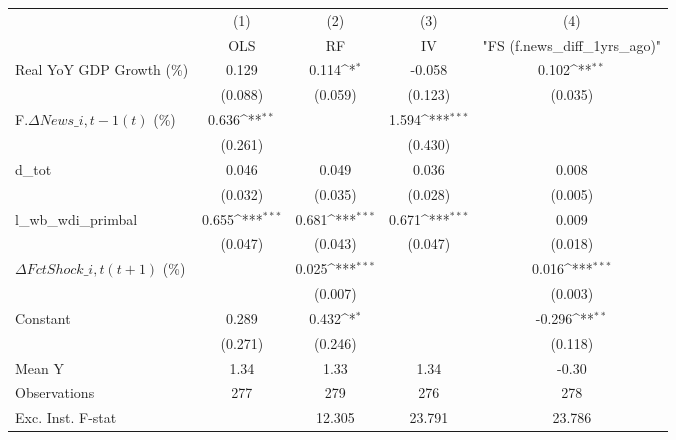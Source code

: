 {
\def\sym#1{\ifmmode^{#1}\else\(^{#1}\)\fi}
\begin{tabular}{l*{4}{c}}
\toprule
                    &\multicolumn{1}{c}{(1)}&\multicolumn{1}{c}{(2)}&\multicolumn{1}{c}{(3)}&\multicolumn{1}{c}{(4)}\\
                    &\multicolumn{1}{c}{OLS}&\multicolumn{1}{c}{RF}&\multicolumn{1}{c}{IV}&\multicolumn{1}{c}{ "FS (f.news\_diff\_1yrs\_ago)" }\\
\midrule
Real YoY GDP Growth (\%)&       0.129         &       0.114\sym{*}  &      -0.058         &       0.102\sym{**} \\
                    &     (0.088)         &     (0.059)         &     (0.123)         &     (0.035)         \\
\addlinespace
F.$ \Delta News\_{i,t-1}(t)$ (\%)&       0.636\sym{**} &                     &       1.594\sym{***}&                     \\
                    &     (0.261)         &                     &     (0.430)         &                     \\
\addlinespace
d\_tot               &       0.046         &       0.049         &       0.036         &       0.008         \\
                    &     (0.032)         &     (0.035)         &     (0.028)         &     (0.005)         \\
\addlinespace
l\_wb\_wdi\_primbal    &       0.655\sym{***}&       0.681\sym{***}&       0.671\sym{***}&       0.009         \\
                    &     (0.047)         &     (0.043)         &     (0.047)         &     (0.018)         \\
\addlinespace
$ \Delta FctShock\_{i,t}(t+1)$ (\%)&                     &       0.025\sym{***}&                     &       0.016\sym{***}\\
                    &                     &     (0.007)         &                     &     (0.003)         \\
\addlinespace
Constant            &       0.289         &       0.432\sym{*}  &                     &      -0.296\sym{**} \\
                    &     (0.271)         &     (0.246)         &                     &     (0.118)         \\
\midrule
Mean Y              &        1.34         &        1.33         &        1.34         &       -0.30         \\
Observations        &         277         &         279         &         276         &         278         \\
Exc. Inst. F-stat   &                     &      12.305         &      23.791         &      23.786         \\
\bottomrule
\end{tabular}
}
